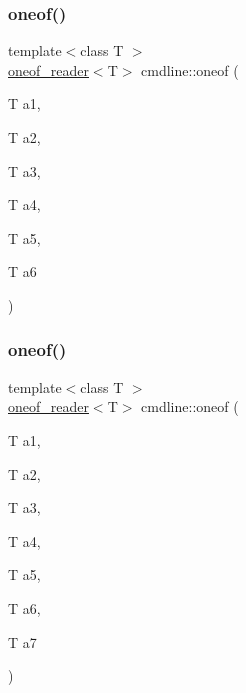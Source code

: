 \mbox{\label{namespacecmdline_a15c6fb15804ac5f2680345f25752737a}} 
\subsubsection{\texorpdfstring{oneof()}{oneof()}\hspace{0.1cm}{\footnotesize\ttfamily [6/10]}}
{\footnotesize\ttfamily template$<$class T $>$ \\
\mbox{\hyperlink{structcmdline_1_1oneof__reader}{oneof\+\_\+reader}}$<$T$>$ cmdline\+::oneof (\begin{DoxyParamCaption}\item[{T}]{a1,  }\item[{T}]{a2,  }\item[{T}]{a3,  }\item[{T}]{a4,  }\item[{T}]{a5,  }\item[{T}]{a6 }\end{DoxyParamCaption})}

\mbox{\label{namespacecmdline_aab50ad7f54137d22779d9e857ccd5450}} 
\subsubsection{\texorpdfstring{oneof()}{oneof()}\hspace{0.1cm}{\footnotesize\ttfamily [7/10]}}
{\footnotesize\ttfamily template$<$class T $>$ \\
\mbox{\hyperlink{structcmdline_1_1oneof__reader}{oneof\+\_\+reader}}$<$T$>$ cmdline\+::oneof (\begin{DoxyParamCaption}\item[{T}]{a1,  }\item[{T}]{a2,  }\item[{T}]{a3,  }\item[{T}]{a4,  }\item[{T}]{a5,  }\item[{T}]{a6,  }\item[{T}]{a7 }\end{DoxyParamCaption})}

\mbox{\label{namespacecmdline_aeb59e9eaeea066b534633e5402180f4e}} 
